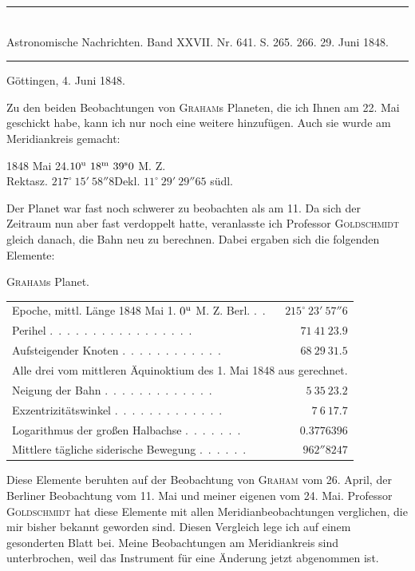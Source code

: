 \clearpage
\hypertarget{native-482-june4}{}
\begin{center}
\rule{0.55\linewidth}{0.4pt}\\[2pt]
Astronomische Nachrichten. Band XXVII. Nr. 641. S. 265. 266. 29. Juni 1848.\\[2pt]
\rule{0.55\linewidth}{0.4pt}
\end{center}
\begin{flushright}Göttingen, 4. Juni 1848.\end{flushright}

Zu den beiden Beobachtungen von \textsc{Graham}s Planeten, die ich Ihnen am 22. Mai geschickt habe, kann ich nur noch eine weitere hinzufügen. Auch sie wurde am Meridiankreis gemacht:

\begin{center}
1848 Mai 24.\quad $10^{\rm u}\ 18^{\rm m}\ 39^{\rm s}0$ M. Z.\\
Rektasz. $217^\circ\ 15'\ 58''8$\qquad Dekl. $11^\circ\ 29'\ 29''65$ südl.
\end{center}

Der Planet war fast noch schwerer zu beobachten als am 11. Da sich der Zeitraum nun aber fast verdoppelt hatte, veranlasste ich Professor \textsc{Goldschmidt} gleich danach, die Bahn neu zu berechnen. Dabei ergaben sich die folgenden Elemente:

\begin{center}
\textsc{Graham}s Planet.\\[3pt]
\small
\setlength{\tabcolsep}{3pt}
\begin{tabular}{lr}
Epoche, mittl. Länge 1848 Mai 1. $0^{\rm u}$ M. Z. Berl. \mbox{.\ .} & $215^\circ\ 23'\ 57''6$ \\
Perihel \mbox{.\ .\ .\ .\ .\ .\ .\ .\ .\ .\ .\ .\ .\ .\ .\ .\ .} & $71\ 41\ 23.9$ \\
Aufsteigender Knoten \mbox{.\ .\ .\ .\ .\ .\ .\ .\ .\ .\ .\ .} & $68\ 29\ 31.5$ \\
\multicolumn{2}{l}{\quad Alle drei vom mittleren Äquinoktium des 1. Mai 1848 aus gerechnet.} \\
Neigung der Bahn \mbox{.\ .\ .\ .\ .\ .\ .\ .\ .\ .\ .\ .\ .} & $5\ 35\ 23.2$ \\
Exzentrizitätswinkel \mbox{.\ .\ .\ .\ .\ .\ .\ .\ .\ .\ .\ .\ .} & $7\ 6\ 17.7$ \\
Logarithmus der großen Halbachse \mbox{.\ .\ .\ .\ .\ .\ .} & $0.3776396$ \\
Mittlere tägliche siderische Bewegung \mbox{.\ .\ .\ .\ .\ .} & $962''8247$ \\
\end{tabular}
\end{center}

Diese Elemente beruhten auf der Beobachtung von \textsc{Graham} vom 26. April, der Berliner Beobachtung vom 11. Mai und meiner eigenen vom 24. Mai. Professor \textsc{Goldschmidt} hat diese Elemente mit allen Meridianbeobachtungen verglichen, die mir bisher bekannt geworden sind. Diesen Vergleich lege ich auf einem gesonderten Blatt bei. Meine Beobachtungen am Meridiankreis sind unterbrochen, weil das Instrument für eine Änderung jetzt abgenommen ist.
